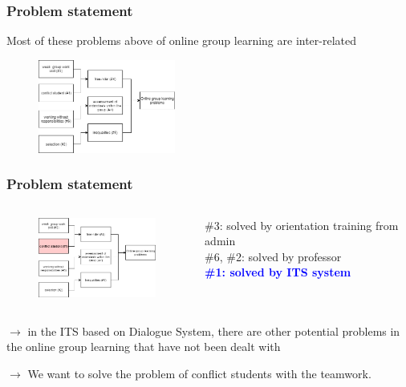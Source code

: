 \documentclass{beamer}
\begin{document}
\begin{frame}
\frametitle{Problem statement}
Most of these problems above of online group learning are inter-related

		\begin{figure}
			\includegraphics[width=45mm]{p1.png}
		\end{figure}






\end{frame}

\begin{frame}
\frametitle{Problem statement}

\begin{columns}
	\begin{column}{.55\textwidth}
	\begin{figure}
		\includegraphics[width=45mm]{p2.png}
	\end{figure}
	\end{column}
\begin{column}{.55\textwidth}
	\#3: solved by orientation training from admin \\
	\#6, \#2: solved by professor\\
	\textcolor{blue}{\textbf{\#1: solved by ITS system}}
\end{column}
\end{columns}
\begin{flushleft}
	
\end{flushleft}

$\rightarrow$ in the ITS based on Dialogue System, there are other potential problems in the online group learning that have not been dealt with

$\rightarrow$	We want to solve the problem of conflict students with the teamwork. 








\end{frame}
\end{document}
